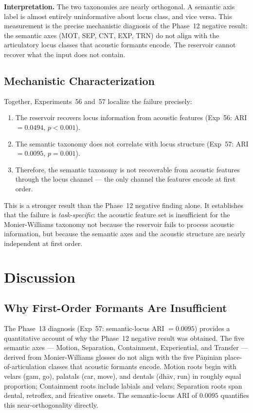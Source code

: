 \documentclass{article}
\begin{document}
\textbf{Interpretation.} The two taxonomies are nearly orthogonal.
A semantic axis label is almost entirely uninformative about locus class,
and vice versa. This measurement is the precise mechanistic diagnosis
of the Phase~12 negative result: the semantic axes (MOT, SEP, CNT, EXP,
TRN) do not align with the articulatory locus classes that acoustic
formants encode. The reservoir cannot recover what the input does not
contain.

\subsection{Mechanistic Characterization}

Together, Experiments~56 and~57 localize the failure precisely:

\begin{enumerate}[noitemsep]
  \item The reservoir recovers locus information from acoustic features
    (Exp~56: ARI $= 0.0494$, $p < 0.001$).
  \item The semantic taxonomy does not correlate with locus structure
    (Exp~57: ARI $= 0.0095$, $p = 0.001$).
  \item Therefore, the semantic taxonomy is not recoverable from
    acoustic features through the locus channel --- the only channel
    the features encode at first order.
\end{enumerate}

This is a stronger result than the Phase~12 negative finding alone. It
establishes that the failure is \emph{task-specific}: the acoustic feature
set is insufficient for the Monier-Williams taxonomy not because the
reservoir fails to process acoustic information, but because the semantic
axes and the acoustic structure are nearly independent at first order.

\section{Discussion}

\subsection{Why First-Order Formants Are Insufficient}

The Phase~13 diagnosis (Exp~57: semantic-locus ARI $= 0.0095$) provides
a quantitative account of why the Phase~12 negative result was obtained.
The five semantic axes --- Motion, Separation, Containment, Experiential,
and Transfer --- derived from Monier-Williams glosses do not align with
the five Pāṇinian place-of-articulation classes that acoustic formants
encode. Motion roots begin with velars (gam, go), palatals (car, move),
and dentals (dhāv, run) in roughly equal proportion; Containment roots
include labials and velars; Separation roots span dental, retroflex, and
fricative onsets. The semantic-locus ARI of $0.0095$ quantifies this
near-orthogonality directly.
\end{document}
